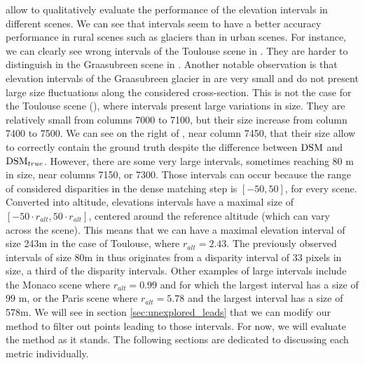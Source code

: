  allow to qualitatively evaluate the performance of the elevation intervals in different scenes. We can see that intervals seem to have a better accuracy performance in rural scenes such as glaciers than in urban scenes. For instance, we can clearly see wrong intervals of the Toulouse scene in . They are harder to distinguish in the Graasubreen scene in . Another notable observation is that elevation intervals of the Graasubreen glacier in  are very small and do not present large size fluctuations along the considered cross-section. This is not the case for the Toulouse scene (), where intervals present large variations in size. They are relatively small from columns 7000 to 7100, but their size increase from column 7400 to 7500. We can see on the right of , near column 7450, that their size allow to correctly contain the ground truth despite the difference between $\mathrm{DSM}$ and $\mathrm{DSM}_{true}$. However, there are some very large intervals, sometimes reaching $80$ m in size, near columns 7150, or 7300. Those intervals can occur because the range of considered disparities in the dense matching step is $[-50, 50]$, for every scene. Converted into altitude, elevations intervals have a maximal size of $[-50\cdot r_{alt}, 50\cdot r_{alt}]$, centered around the reference altitude (which can vary across the scene). This means that we can have a maximal elevation interval of size 243m in the case of Toulouse, where $r_{alt}=2.43$. The previously observed intervals of size 80m in  thus originates from a disparity interval of 33 pixels in size, \ie a third of the disparity intervals. Other examples of large intervals include the Monaco scene where $r_{alt}=0.99$ and for which the largest interval has a size of $99$ m, or the Paris scene where  $r_{alt}=5.78$ and the largest interval has a size of 578m. We will see in section \ref{sec:unexplored_leads} that we can modify our method to filter out points leading to those intervals. For now, we will evaluate the method as it stands. The following sections are dedicated to discussing each metric individually.

